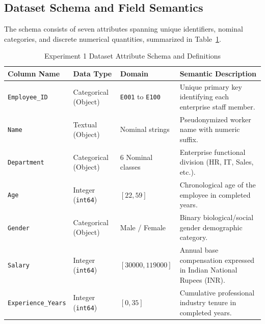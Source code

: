 \subsection{Dataset Schema and Field Semantics}
The schema consists of seven attributes spanning unique identifiers, nominal categories, and discrete numerical quantities, summarized in Table~\ref{tab:exp1_schema}.
\begin{table}[H]
\centering
\small
\caption{Experiment 1 Dataset Attribute Schema and Definitions}
\label{tab:exp1_schema}
\begin{tabularx}{\textwidth}{lp{3cm}lp{6cm}}
\toprule
\textbf{Column Name} & \textbf{Data Type} & \textbf{Domain} & \textbf{Semantic Description} \\
\midrule
\texttt{Employee\_ID} & Categorical (Object) & \texttt{E001} to \texttt{E100} & Unique primary key identifying each enterprise staff member. \\
\texttt{Name} & Textual (Object) & Nominal strings & Pseudonymized worker name with numeric suffix. \\
\texttt{Department} & Categorical (Object) & 6 Nominal classes & Enterprise functional division (HR, IT, Sales, etc.). \\
\texttt{Age} & Integer (\texttt{int64}) & $[22, 59]$ & Chronological age of the employee in completed years. \\
\texttt{Gender} & Categorical (Object) & Male / Female & Binary biological/social gender demographic category. \\
\texttt{Salary} & Integer (\texttt{int64}) & $[30000, 119000]$ & Annual base compensation expressed in Indian National Rupees (INR). \\
\texttt{Experience\_Years} & Integer (\texttt{int64}) & $[0, 35]$ & Cumulative professional industry tenure in completed years. \\
\bottomrule
\end{tabularx}
\end{table}

